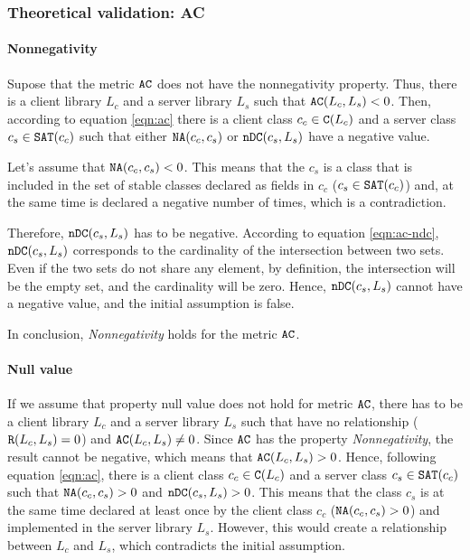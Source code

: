 \subsubsection{Theoretical validation: AC}

\paragraph{Nonnegativity}
Supose that the metric $\verb|AC|$ does not have the nonnegativity property. Thus, there is a client library $L_c$ and a server library $L_s$ such that $\verb|AC|(L_c, L_s) < 0$. Then, according to equation \ref{eqn:ac} there is a client class $c_c \in \verb|C|(L_c)$ and a server class $c_s \in \verb|SAT|(c_c)$ such that either $\verb|NA|(c_c, c_s)$ or $\verb|nDC|(c_s, L_s)$ have a negative value.

Let's assume that $\verb|NA|(c_c, c_s) < 0$. This means that the $c_s$ is a class that is included in the set of stable classes declared as fields in $c_c$ ($c_s \in \verb|SAT|(c_c)$) and, at the same time is declared a negative number of times, which is a contradiction.

Therefore, $\verb|nDC|(c_s, L_s)$ has to be negative. According to equation \ref{eqn:ac-ndc}, $\verb|nDC|(c_s, L_s)$ corresponds to the cardinality of the intersection between two sets. Even if the two sets do not share any element, by definition, the intersection will be the empty set, and the cardinality will be zero. Hence, $\verb|nDC|(c_s, L_s)$ cannot have a negative value, and the initial assumption is false.

In conclusion, \textit{Nonnegativity} holds for the metric $\verb|AC|$.

\paragraph{Null value}
If we assume that property null value does not hold for metric $\verb|AC|$, there has to be a client library $L_c$ and a server library $L_s$ such that have no relationship ($\verb|R|(L_c, L_s) = 0$) and $\verb|AC|(L_c, L_s)	\neq 0$. Since $\verb|AC|$ has the property \textit{Nonnegativity}, the result cannot be negative, which means that $\verb|AC|(L_c, L_s) > 0$. Hence, following equation \ref{eqn:ac}, there is a client class $c_c \in \verb|C|(L_c)$ and a server class $c_s \in \verb|SAT|(c_c)$ such that $\verb|NA|(c_c, c_s) > 0$ and $\verb|nDC|(c_s, L_s) > 0$. This means that the class $c_s$ is at the same time declared at least once by the client class $c_c$ ($\verb|NA|(c_c, c_s) > 0$) and implemented in the server library $L_s$. However, this would create a relationship between $L_c$ and $L_s$, which contradicts the initial assumption.

